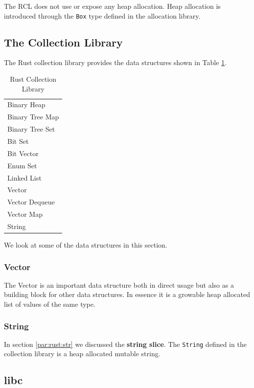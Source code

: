The RCL does not use or expose any heap allocation.
Heap allocation is introduced through the \texttt{Box} type defined in the allocation library.

\subsection{The Collection Library}

The Rust collection library provides the data structures shown in Table \ref{tab:rust:collections}.

\begin{table}[H]
  \begin{tabular}{l}
    Binary Heap \\
    Binary Tree Map \\
    Binary Tree Set \\
    Bit Set \\
    Bit Vector \\
    Enum Set \\
    Linked List \\
    Vector \\
    Vector Dequeue \\
    Vector Map \\
    String \\
  \end{tabular}
  \caption{Rust Collection Library}
  \label{tab:rust:collections}
\end{table}

We look at some of the data structures in this section.

\subsubsection{Vector}

The Vector is an important data structure both in direct usage but also as a building block for other data structures.
In essence it is a growable heap allocated list of values of the same type.

\subsubsection{String}

In section \ref{par:rust:str} we discussed the \textbf{string slice}.
The \texttt{String} defined in the collection library is a heap allocated mutable string.

\subsection{libc}

